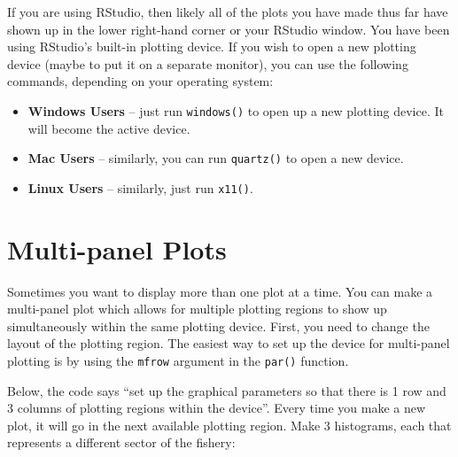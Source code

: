 \documentclass[]{book}
\newenvironment{Shaded}{\begin{snugshade}}{\end{snugshade}}
\newcommand{\KeywordTok}[1]{\textcolor[rgb]{0.13,0.29,0.53}{\textbf{#1}}}
\newcommand{\DataTypeTok}[1]{\textcolor[rgb]{0.13,0.29,0.53}{#1}}
\newcommand{\DecValTok}[1]{\textcolor[rgb]{0.00,0.00,0.81}{#1}}
\newcommand{\StringTok}[1]{\textcolor[rgb]{0.31,0.60,0.02}{#1}}
\newcommand{\ControlFlowTok}[1]{\textcolor[rgb]{0.13,0.29,0.53}{\textbf{#1}}}
\newcommand{\OperatorTok}[1]{\textcolor[rgb]{0.81,0.36,0.00}{\textbf{#1}}}
\newcommand{\NormalTok}[1]{#1}
\providecommand{\tightlist}{%
  \setlength{\itemsep}{0pt}\setlength{\parskip}{0pt}}
\theoremstyle{definition}
\theoremstyle{definition}
\theoremstyle{definition}
\theoremstyle{remark}
\begin{document}
If you are using RStudio, then likely all of the plots you have made
thus far have shown up in the lower right-hand corner or your RStudio
window. You have been using RStudio's built-in plotting device. If you
wish to open a new plotting device (maybe to put it on a separate
monitor), you can use the following commands, depending on your
operating system:

\begin{itemize}
\tightlist
\item
  \textbf{Windows Users} -- just run \texttt{windows()} to open up a new
  plotting device. It will become the active device.
\item
  \textbf{Mac Users} -- similarly, you can run \texttt{quartz()} to open
  a new device.
\item
  \textbf{Linux Users} -- similarly, just run \texttt{x11()}.
\end{itemize}

\section{Multi-panel Plots}\label{multi-panel-plots}

Sometimes you want to display more than one plot at a time. You can make
a multi-panel plot which allows for multiple plotting regions to show up
simultaneously within the same plotting device. First, you need to
change the layout of the plotting region. The easiest way to set up the
device for multi-panel plotting is by using the \texttt{mfrow} argument
in the \texttt{par()} function.

Below, the code says ``set up the graphical parameters so that there is
1 row and 3 columns of plotting regions within the device''. Every time
you make a new plot, it will go in the next available plotting region.
Make 3 histograms, each that represents a different sector of the
fishery:

\begin{Shaded}
\end{Shaded}
\end{document}
